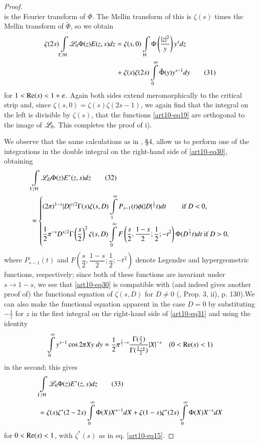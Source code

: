 \begin{proof}
$$$$
is the Fourier transform of $\Phi$. The Mellin transform of this is $\zeta(s)$ times the Mellin transform of $\tilde{\Phi}$, so we obtain 
\begin{align*}
\zeta (2s) \int\limits_{\Gamma / \mathsf{H}} \mathscr{L}_0 \Phi (z) E (z,s)& d z  = \zeta (s, 0) \int\limits_{\mathsf{H}} \Phi \left(\frac{|z|^2}{y} \right) y^s dz\\
&\quad + \zeta(s) \zeta(2s) \int\limits^\infty_{0} \tilde{\Phi} (y) y^{s-1} dy \tag{31}\label{art10-eq31}
\end{align*}
for $1 < \operatorname{Re} (s) < 1+ \varepsilon$. Again both sides extend meromorphically to the critical strip and, since $\zeta(s,0) = \zeta (s) \zeta (2s-1)$, we again find that the integral on the left is divisible by $\zeta(s)$, \ie that the functions \eqref{art10-eq19} are orthogonal to the image of $\mathscr{L}_0$. This completes the proof of i).

We observe that the same calculations as in \cite{art10-12}, \S 4, allow us to perform one of the integrations in the double integral on the right-hand side of \eqref{art10-eq30}, obtaining 
\begin{align*}
& \int\limits_{\Gamma/ \mathsf{H}} \mathscr{L}_D \Phi (z) E^\ast (z,s) dz \tag{32}\label{art10-eq32}\\
& = \left\{
\begin{aligned}
& (2\pi)^{1-s} |D|^{s/2} \Gamma (s) \zeta (s, D) \int\limits^\infty_1 P_{s-1} (t) \phi (|D|^{\frac{1}{2}} t) dt \qquad \text{ if } D < 0, \\
& \frac{1}{2} \pi^{-s} D^{s/2} \Gamma \left(\frac{s}{2} \right)^2 \zeta (s,D) \int\limits^\infty_0 F \left(\frac{s}{2}, \frac{1-s}{2}; \frac{1}{2}; -t^2 \right) \Phi (D^{\frac{1}{2}} t) dt ~ \text{if } D > 0, 
\end{aligned}
\right.
\end{align*}
where $P_{s-1} (t)$ and $F \left(\dfrac{s}{2}, \dfrac{1-s}{2}; \dfrac{1}{2}; - t^2 \right)$ denote Legendre and hypergeometric functions, respectively; since both of these functions are invariant under $s \to 1 - s$, we see that \eqref{art10-eq30} is compatible with (and indeed gives another proof of) the functional equation of $\zeta (s, D)$ for $D \neq 0$ (\cite{art10-11}, Prop. 3, ii), p. 130).\pageoriginale We can also make the functional equation apparent in the case $D = 0$ by substituting $-\frac{1}{z}$ for $z$ in the first integral on the right-hand side of \eqref{art10-eq31} and using the identity
$$
\int\limits^\infty_{0} y^{s-1} \cos 2 \pi X y \; dy = \frac{1}{2} \pi^{\frac{1}{2} -s} \frac{\Gamma (\frac{s}{2})}{\Gamma (\frac{1-s}{2})} |X|^{-s} \quad (0 < \operatorname{Re} (s) < 1)
$$
in the second; this gives 
\begin{align*}
& \int\limits_{\Gamma / \mathsf{H}} \mathscr{L}_0 \Phi (z) E^{\ast} (z,s) dz \tag{33}\label{art10-eq33}\\
& = \zeta (s) \zeta^\ast (2 - 2 s) \int\limits^\infty_{0} \Phi (X) X^{s-1} dX + \zeta (1-s) \zeta^{\ast} (2s) \int\limits^\infty_{0} \Phi (X) X^{-s} d X
\end{align*}
for $0 < \operatorname{Re} (s) <1$, with $\zeta^\ast (s)$ as in eq. \eqref{art10-eq15}.


\end{proof}
